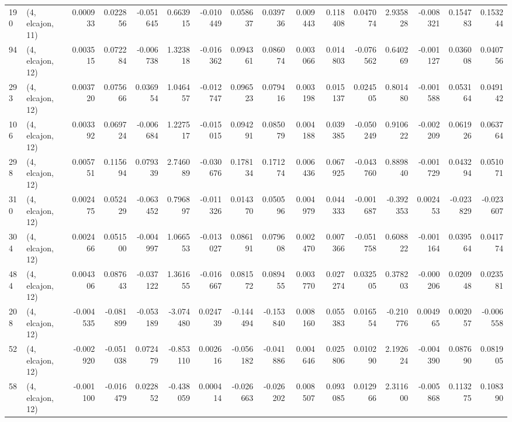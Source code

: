 \begin{tabular}{llrrrrrrrrrrrrrr}
190 &  (4, elcajon, 11) &   0.000933 &  0.022856 & -0.051645 &    0.663915 & -0.010449 &   0.058637 &   0.039736 &  0.009443 &  0.118408 &  0.047074 &    2.935828 & -0.008321 &   0.154783 &   0.153244 \\
94  &  (4, elcajon, 12) &   0.003515 &  0.072284 & -0.006738 &    1.323818 & -0.016362 &   0.094361 &   0.086074 &  0.003066 &  0.014803 & -0.076562 &    0.640269 & -0.001127 &   0.036008 &   0.040756 \\
293 &  (4, elcajon, 12) &   0.003720 &  0.075666 &  0.036954 &    1.046457 & -0.012747 &   0.096523 &   0.079416 &  0.003198 &  0.015137 &  0.024505 &    0.801480 & -0.001588 &   0.053164 &   0.049142 \\
106 &  (4, elcajon, 12) &   0.003392 &  0.069724 & -0.006684 &    1.227517 & -0.015015 &   0.094291 &   0.085079 &  0.004188 &  0.039385 & -0.050249 &    0.910622 & -0.002209 &   0.061926 &   0.063764 \\
298 &  (4, elcajon, 12) &   0.005751 &  0.115694 &  0.079339 &    2.746089 & -0.030676 &   0.178134 &   0.171274 &  0.006436 &  0.067925 & -0.043760 &    0.889840 & -0.001729 &   0.043294 &   0.051071 \\
310 &  (4, elcajon, 12) &   0.002475 &  0.052429 & -0.063452 &    0.796897 & -0.011326 &   0.014370 &   0.050596 &  0.004979 &  0.044333 & -0.001687 &   -0.392353 &  0.002453 &  -0.023829 &  -0.023607 \\
304 &  (4, elcajon, 12) &   0.002466 &  0.051500 & -0.004997 &    1.066553 & -0.013027 &   0.086191 &   0.079608 &  0.002470 &  0.007366 & -0.051758 &    0.608822 & -0.001164 &   0.039564 &   0.041774 \\
484 &  (4, elcajon, 12) &   0.004306 &  0.087643 & -0.037122 &    1.361655 & -0.016667 &   0.081572 &   0.089455 &  0.003770 &  0.027274 &  0.032505 &    0.378203 & -0.000206 &   0.020948 &   0.023581 \\
208 &  (4, elcajon, 12) &  -0.004535 & -0.081899 & -0.053189 &   -3.074480 &  0.024739 &  -0.144494 &  -0.153840 &  0.008160 &  0.055383 &  0.016554 &   -0.210776 &  0.004965 &   0.002057 &  -0.006558 \\
52  &  (4, elcajon, 12) &  -0.002920 & -0.051038 &  0.072479 &   -0.853110 &  0.002616 &  -0.056182 &  -0.041886 &  0.004646 &  0.025806 &  0.010290 &    2.192624 & -0.004390 &   0.087690 &   0.081905 \\
58  &  (4, elcajon, 12) &  -0.001100 & -0.016479 &  0.022852 &   -0.438059 &  0.000414 &  -0.026663 &  -0.026202 &  0.008507 &  0.093085 &  0.012966 &    2.311600 & -0.005868 &   0.113275 &   0.108390 \\

\end{tabular}
